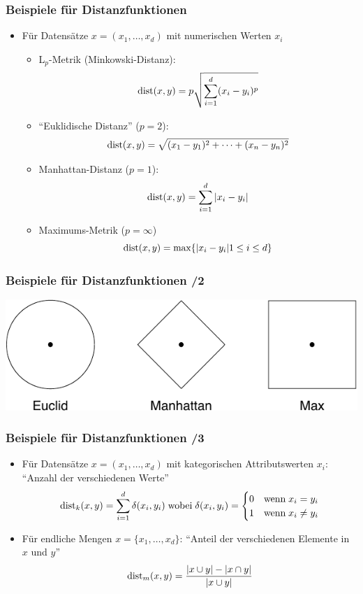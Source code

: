 \begin{frame}%
\frametitle{Beispiele für Distanzfunktionen}

\begin{itemize}
\item Für Datensätze $x= (x_1, \dots, x_d)$ mit numerischen Werten $x_i$
\begin{itemize}
\item L$_p$-Metrik (Minkowski-Distanz): $$\operatorname{dist}(x, y) = p \sqrt{\sum_{i=1}^d (x_i - y_i)^p}$$
\item "`Euklidische Distanz"' ($p=2$): $$\operatorname{dist}(x, y) = \sqrt{(x_1 -
    y_1)^2 + \dots + (x_n - y_n)^2}$$
\item Manhattan-Distanz ($p=1$): $$\operatorname{dist}(x,y) = \sum_{i=1}^d|x_i - y_i|$$
\item Maximums-Metrik ($p = \infty$) $$\operatorname{dist}(x,y) = \max\{|x_i - y_i| 1 \leq i
    \leq d\} $$
\end{itemize}
\end{itemize}

\end{frame}

\begin{frame}%
\frametitle{Beispiele für Distanzfunktionen /2}

\begin{center}
\includegraphics[scale=1]{fig7/distance.pdf}
\end{center}

\end{frame}


\begin{frame}%
\frametitle{Beispiele für Distanzfunktionen /3}

\begin{itemize}
\item Für Datensätze $x= (x_1, \dots, x_d)$ mit kategorischen
  Attributswerten $x_i$:
"`Anzahl der verschiedenen Werte"'
$$\operatorname{dist}_k(x,y)=\sum_{i=1}^d \delta(x_i,
y_i)\;\text{wobei}\;\delta(x_i,y_i) =
\begin{cases}
0 & \text{wenn}\; x_i=y_i \\
1 & \text{wenn}\; x_i\neq y_i
\end{cases}$$
\item Für endliche Mengen $x= \{x_1, \dots, x_d\}$: "`Anteil der
  verschiedenen Elemente in $x$ und $y$"'
$$\operatorname{dist}_m(x, y) = \frac{|x \cup y| - |x \cap y|}{|x \cup y|}$$
\end{itemize}
\end{frame}

